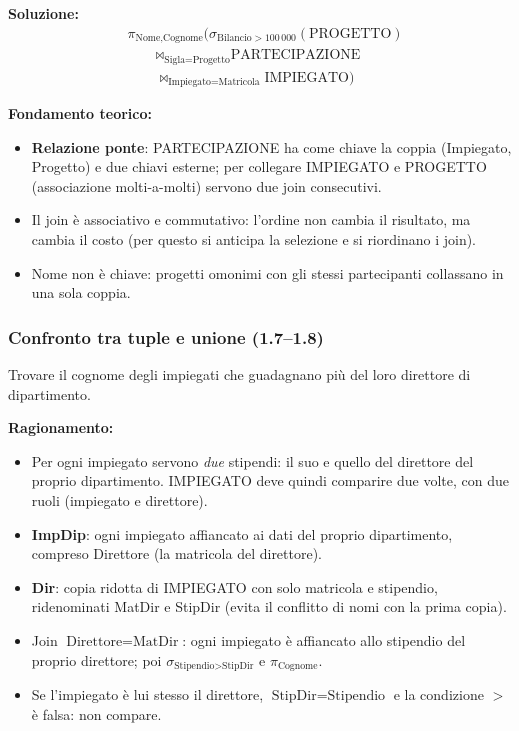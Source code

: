\documentclass[12pt, a4paper]{article}
\begin{document}
\textbf{Soluzione:}
\begin{align*}
&\pi_{\text{Nome},\text{Cognome}}\Big(\sigma_{\text{Bilancio}>100\,000}(\text{PROGETTO})\\
&\qquad\bowtie_{\text{Sigla}=\text{Progetto}}\text{PARTECIPAZIONE}\\
&\qquad\bowtie_{\text{Impiegato}=\text{Matricola}}\text{IMPIEGATO}\Big)
\end{align*}

\textbf{Fondamento teorico:}
\begin{itemize}
\item \textbf{Relazione ponte}: PARTECIPAZIONE ha come chiave la coppia (Impiegato, Progetto) e due chiavi esterne; per collegare IMPIEGATO e PROGETTO (associazione molti-a-molti) servono due join consecutivi.
\item Il join è associativo e commutativo: l'ordine non cambia il risultato, ma cambia il costo (per questo si anticipa la selezione e si riordinano i join).
\item Nome non è chiave: progetti omonimi con gli stessi partecipanti collassano in una sola coppia.
\end{itemize}

\subsubsection{Confronto tra tuple e unione (1.7--1.8)}

\begin{tcolorbox}[colback=lightergray!10, colframe=tocsec, title=\textbf{Esercizio 1.7}]
Trovare il cognome degli impiegati che guadagnano più del loro direttore di dipartimento.
\end{tcolorbox}

\textbf{Ragionamento:}
\begin{itemize}
\item Per ogni impiegato servono \emph{due} stipendi: il suo e quello del direttore del proprio dipartimento. IMPIEGATO deve quindi comparire due volte, con due ruoli (impiegato e direttore).
\item \textbf{ImpDip}: ogni impiegato affiancato ai dati del proprio dipartimento, compreso Direttore (la matricola del direttore).
\item \textbf{Dir}: copia ridotta di IMPIEGATO con solo matricola e stipendio, ridenominati MatDir e StipDir (evita il conflitto di nomi con la prima copia).
\item Join $\text{Direttore}=\text{MatDir}$: ogni impiegato è affiancato allo stipendio del proprio direttore; poi $\sigma_{\text{Stipendio}>\text{StipDir}}$ e $\pi_{\text{Cognome}}$.
\item Se l'impiegato è lui stesso il direttore, $\text{StipDir}=\text{Stipendio}$ e la condizione $>$ è falsa: non compare.
\end{itemize}
\end{document}

